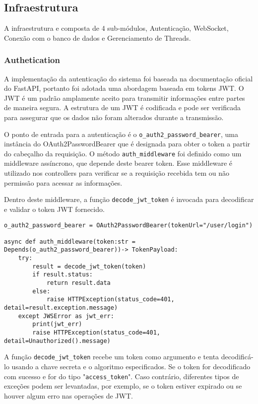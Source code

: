 \subsection{Infraestrutura}\label{subsec:infra}

A infraestrutura e composta de 4 sub-módulos, Autenticação, WebSocket, Conexão com o banco de dados e Gerenciamento de Threads.

\subsubsection{Authetication}\label{subsubsec:auth}
A implementação da autenticação do sistema foi baseada na documentação oficial do FastAPI, portanto foi adotada uma abordagem baseada em tokens \gls{JWT}. O \gls{JWT} é um padrão amplamente aceito para transmitir informações entre partes de maneira segura. A estrutura de um \gls{JWT} é codificada e pode ser verificada para assegurar que os dados não foram alterados durante a transmissão. 

O ponto de entrada para a autenticação é o \texttt{o\_auth2\_password\_bearer}, uma instância do OAuth2PasswordBearer que é designada para obter o token a partir do cabeçalho da requisição. O método \texttt{auth\_middleware} foi definido como um middleware assíncrono, que depende deste bearer token. Esse middleware é utilizado nos controllers para verificar se a requisição recebida tem ou não permissão para acessar as informações.


Dentro deste middleware, a função \texttt{decode\_jwt\_token} é invocada para decodificar e validar o token \gls{JWT} fornecido.

\begin{verbatim}
o_auth2_password_bearer = OAuth2PasswordBearer(tokenUrl="/user/login")

async def auth_middleware(token:str = Depends(o_auth2_password_bearer))-> TokenPayload:
    try:
        result = decode_jwt_token(token)
        if result.status:
            return result.data
        else:
            raise HTTPException(status_code=401, detail=result.exception.message)
    except JWSError as jwt_err:
        print(jwt_err)
        raise HTTPException(status_code=401, detail=Unauthorized().message)
\end{verbatim}

A função \texttt{decode\_jwt\_token} recebe um token como argumento e tenta decodificá-lo usando a chave secreta e o algoritmo especificados. Se o token for decodificado com sucesso e for do tipo "\texttt{access\_token}". Caso contrário, diferentes tipos de exceções podem ser levantadas, por exemplo, se o token estiver expirado ou se houver algum erro nas operações de \gls{JWT}.

